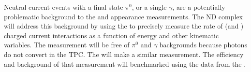 Neutral current events with a final state $\pi^0$, or a single $\gamma$, are a potentially problematic background to the \nue and \anue appearance measurements. The ND complex will address this background by using the  to precisely measure the rate of \nue (and \anue) charged current interactions as a function of energy and other kinematic variables. The measurement will be free of $\pi^0$ and $\gamma$ backgrounds because photons do not convert in the  TPC. The \larnd will make a similar measurement. The efficiency and background of that measurement will benchmarked using the data from the . 


